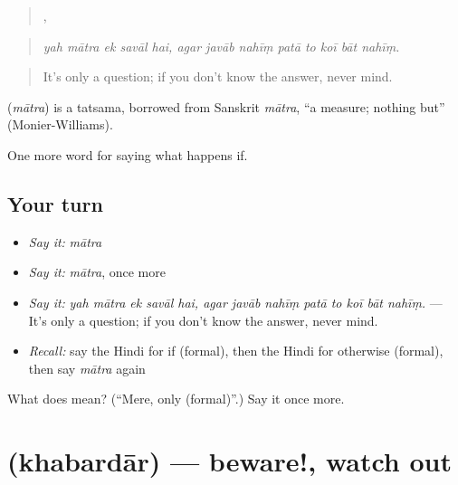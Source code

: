 \begin{quote}
    ,        
\end{quote}

\begin{quote}
\emph{yah mātra ek savāl hai, agar javāb nahīṃ patā to koī bāt nahīṃ.}
\end{quote}

\begin{quote}
It's only a question; if you don't know the answer, never mind.
\end{quote}

\begin{cousinweb}
\textbf{} (\emph{mātra}) is a tatsama, borrowed from Sanskrit \emph{mātra}, \textquotedblleft{}a measure; nothing but\textquotedblright{} (Monier-Williams).
\end{cousinweb}

\begin{grammarlens}[title={What you've built}]
One more word for saying what happens if.
\end{grammarlens}

\subsection*{Your turn}
\begin{itemize}
\raggedright
  \item \emph{Say it:} \emph{mātra}
  \item \emph{Say it:} \emph{mātra}, once more
  \item \emph{Say it:} \emph{yah mātra ek savāl hai, agar javāb nahīṃ patā to koī bāt nahīṃ.} — It's only a question; if you don't know the answer, never mind.
  \item \emph{Recall:} say the Hindi for if (formal), then the Hindi for otherwise (formal), then say \emph{mātra} again
\end{itemize}

\begin{tcolorbox}[breakable,colback=teal!4,colframe=teal!35!black,title={Before you move on}]
What does  mean? (\textquotedblleft{}Mere, only (formal)\textquotedblright{}.) Say it once more.
\end{tcolorbox}
\section[\texorpdfstring{\hi{ख़बरदार} (khabardār)}{ख़बरदार (khabardār)}]{ (khabardār) — beware!, watch out}

